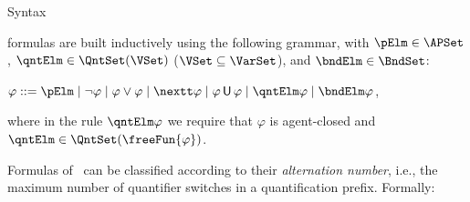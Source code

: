 \begin{subsection}{Syntax}

		
		
		\begin{definition}
			\NGGSLT formulas are built inductively
			using the following grammar, with $\pElm \in \APSet$, $\qntElm \in
			 \QntSet(\VSet)$ ($\VSet \subseteq \VarSet$),
			 and $\bndElm \in
			\BndSet$:
			\begin{center}
				$\varphi ::= \pElm \mid \neg \varphi \mid
				\varphi \vee \varphi \mid \nextt \varphi \mid \varphi \until \varphi \mid
				 \qntElm \varphi \mid \bndElm \varphi$,
			\end{center}
			where in the rule $\qntElm \varphi$ we require that $\varphi$
			is agent-closed and $\qntElm \in \QntSet(\freeFun{\varphi})$.
		\end{definition}
		
		
		Formulas of \NGGSLT\ can be classified according to their \emph{alternation 
		number}, i.e., the maximum number of quantifier switches in a quantification prefix. Formally:
		

\end{subsection}
